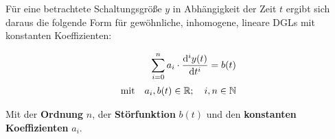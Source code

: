 \begin{frame}
{    Für eine betrachtete Schaltungsgröße $y$ in Abhängigkeit der Zeit $t$ ergibt sich daraus 
    die folgende Form für gewöhnliche, inhomogene, lineare DGLs mit konstanten Koeffizienten:

    \begin{align}\label{eq:grundlagen:dgl:inhomogen}
        \sum_{i=0}^{n} a_i \cdot \frac{\mathrm{d}^i y(t)}{\mathrm{d} t^i} = b(t)\\[2pt]\nonumber
        \text{mit} \quad a_i, b(t) \in \mathbb{R}; \quad i, n \in \mathbb{N}
    \end{align}

    Mit der \textbf{Ordnung} $n$, 
    der \textbf{Störfunktion} $b(t)$ und den \textbf{konstanten Koeffizienten} $a_i$. 

}
\end{frame}
